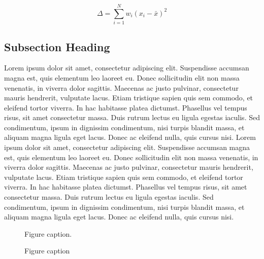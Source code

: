 \documentclass{article}
\begin{document}
\begin{equation}
\Delta =\sum_{i=1}^N w_i (x_i - \bar{x})^2
\label{eqn:eq1}
\end{equation}

\subsection{Subsection Heading}

Lorem ipsum dolor sit amet, consectetur adipiscing elit. Suspendisse accumsan magna est, quis elementum leo laoreet eu. Donec sollicitudin elit non massa venenatis, in viverra dolor sagittis. Maecenas ac justo pulvinar, consectetur mauris hendrerit, vulputate lacus. Etiam tristique sapien quis sem commodo, et eleifend tortor viverra. In hac habitasse platea dictumst. Phasellus vel tempus risus, sit amet consectetur massa. Duis rutrum lectus eu ligula egestas iaculis. Sed condimentum, ipsum in dignissim condimentum, nisi turpis blandit massa, et aliquam magna ligula eget lacus. Donec ac eleifend nulla, quis cursus nisi. Lorem ipsum dolor sit amet, consectetur adipiscing elit. Suspendisse accumsan magna est, quis elementum leo laoreet eu. Donec sollicitudin elit non massa venenatis, in viverra dolor sagittis. Maecenas ac justo pulvinar, consectetur mauris hendrerit, vulputate lacus. Etiam tristique sapien quis sem commodo, et eleifend tortor viverra. In hac habitasse platea dictumst. Phasellus vel tempus risus, sit amet consectetur massa. Duis rutrum lectus eu ligula egestas iaculis. Sed condimentum, ipsum in dignissim condimentum, nisi turpis blandit massa, et aliquam magna ligula eget lacus. Donec ac eleifend nulla, quis cursus nisi.

\begin{figure*}
\begin{center}
\caption
{Figure caption. }
\label{fig:f1}
\end{center}
\end{figure*}

\begin{figure*}
\begin{center}
\caption
{Figure caption}
\label{fig:f2}
\end{center}
\end{figure*}
\end{document}

